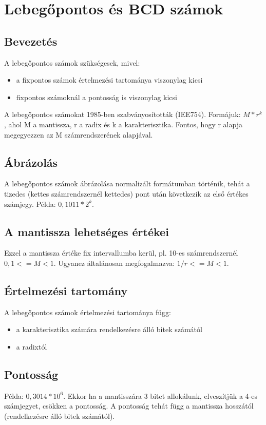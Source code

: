 
\chapter{Lebegőpontos és BCD számok}

\section{Bevezetés}
A lebegőpontos számok szükségesek, mivel:
\begin{itemize}
    \item a fixpontos számok értelmezési tartománya viszonylag kicsi
    \item fixpontos számoknál a pontosság is viszonylag kicsi
\end{itemize}

A lebegőpontos számokat 1985-ben szabványosították (IEE754).
Formájuk: $M*r^k$, ahol M a mantissza, r a radix és k a karakterisztika.
Fontos, hogy r alapja megegyezzen az M számrendszerének alapjával.

\section{Ábrázolás}
A lebegőpontos számok ábrázolása normalizált formátumban történik, tehát a tizedes (kettes számrendszernél kettedes) pont után következik az első értékes számjegy.
Példa: $0,1011*2^k$.

\section{A mantissza lehetséges értékei}
Ezzel a mantissza értéke fix intervallumba kerül, pl. 10-es számrendszernél $0,1 <= M < 1$.
Ugyanez általánosan megfogalmazva: $1/r <= M < 1$.

\section{Értelmezési tartomány}
A lebegőpontos számok értelmezési tartománya függ:
\begin{itemize}
    \item a karakterisztika számára rendelkezésre álló bitek számától
    \item a radixtól
\end{itemize}

\section{Pontosság}
Példa: $0,3014*10^6$.
Ekkor ha a mantisszára 3 bitet allokálunk, elveszítjük a 4-es számjegyet, csökken a pontosság.
A pontosság tehát függ a mantissza hosszától (rendelkezésre álló bitek számától).


